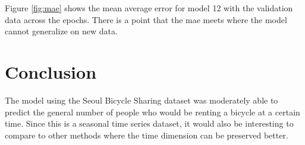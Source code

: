 \documentclass{article}
\begin{document}
    Figure \ref{fig:mae} shows the mean average error for model 12 with the validation data across the epochs. There is a point that the mae 
    meets where the model cannot generalize on new data.

\section{Conclusion}
    The model using the Seoul Bicycle Sharing dataset was moderately able to predict the general number of people who would be renting a bicycle 
    at a certain time. Since this is a seasonal time series dataset, it would also be interesting to compare to other methods where the time 
    dimension can be preserved better.
\end{document}
